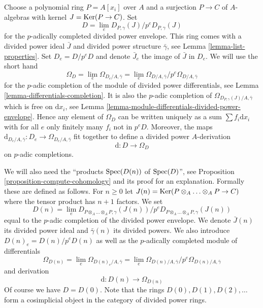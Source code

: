 \medskip\noindent
Choose a polynomial ring $P = A[x_i]$ over $A$ and a surjection $P \to C$
of $A$-algebras with kernel $J = \mathop{\mathrm{Ker}}(P \to C)$. Set
\begin{equation}
\label{equation-D}
D = \lim_e D_{P, \gamma}(J) / p^eD_{P, \gamma}(J)
\end{equation}
for the $p$-adically completed divided power envelope.
This ring comes with a divided power ideal $\bar J$ and divided power
structure $\bar \gamma$, see Lemma \ref{lemma-list-properties}.
Set $D_e = D/p^eD$ and denote $\bar J_e$ the image of $\bar J$ in $D_e$.
We will use the short hand
\begin{equation}
\label{equation-omega-D}
\Omega_D = \lim_e \Omega_{D_e/A, \bar\gamma} =
\lim_e \Omega_{D/A, \bar\gamma}/p^e\Omega_{D/A, \bar\gamma}
\end{equation}
for the $p$-adic completion of the module of divided power differentials,
see Lemma \ref{lemma-differentials-completion}.
It is also the $p$-adic completion of
$\Omega_{D_{P, \gamma}(J)/A, \bar\gamma}$
which is free on $\text{d}x_i$, see
Lemma \ref{lemma-module-differentials-divided-power-envelope}.
Hence any element of $\Omega_D$ can be written uniquely as a sum
$\sum f_i\text{d}x_i$ with for all $e$ only finitely many $f_i$
not in $p^eD$. Moreover, the maps
$\text{d}_{D_e/A, \bar\gamma} : D_e \to \Omega_{D_e/A, \bar\gamma}$
fit together to define a divided power $A$-derivation
\begin{equation}
\label{equation-derivation-D}
\text{d} : D \longrightarrow \Omega_D
\end{equation}
on $p$-adic completions.

\medskip\noindent
We will also need the ``products $\mathop{\mathrm{Spec}}(D(n))$ of $\mathop{\mathrm{Spec}}(D)$'', see
Proposition \ref{proposition-compute-cohomology} and its proof for an
explanation. Formally these are defined as follows. For $n \geq 0$ let
$J(n) = \mathop{\mathrm{Ker}}(P \otimes_A \ldots \otimes_A P \to C)$ where
the tensor product has $n + 1$ factors. We set
\begin{equation}
\label{equation-Dn}
D(n) = \lim_e
D_{P \otimes_A \ldots \otimes_A P, \gamma}(J(n))/
p^eD_{P \otimes_A \ldots \otimes_A P, \gamma}(J(n))
\end{equation}
equal to the $p$-adic completion of the divided power envelope.
We denote $\bar J(n)$ its divided power ideal and $\bar \gamma(n)$
its divided powers. We also introduce $D(n)_e = D(n)/p^eD(n)$ as well
as the $p$-adically completed module of differentials
\begin{equation}
\label{equation-omega-Dn}
\Omega_{D(n)} = \lim_e \Omega_{D(n)_e/A, \bar\gamma} =
\lim_e \Omega_{D(n)/A, \bar\gamma}/p^e\Omega_{D(n)/A, \bar\gamma}
\end{equation}
and derivation
\begin{equation}
\label{equation-derivation-Dn}
\text{d} : D(n) \longrightarrow \Omega_{D(n)}
\end{equation}
Of course we have $D = D(0)$. Note that the rings $D(0), D(1), D(2), \ldots$
form a cosimplicial object in the category of divided power rings.

